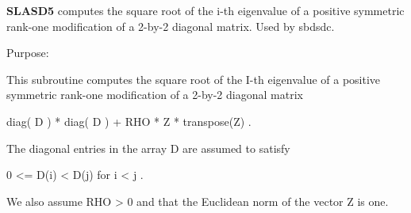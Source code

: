 {\bfseries S\+L\+A\+S\+D5} computes the square root of the i-\/th eigenvalue of a positive symmetric rank-\/one modification of a 2-\/by-\/2 diagonal matrix. Used by sbdsdc. 

 \begin{DoxyParagraph}{Purpose\+: }
\begin{DoxyVerb} This subroutine computes the square root of the I-th eigenvalue
 of a positive symmetric rank-one modification of a 2-by-2 diagonal
 matrix

            diag( D ) * diag( D ) +  RHO * Z * transpose(Z) .

 The diagonal entries in the array D are assumed to satisfy

            0 <= D(i) < D(j)  for  i < j .

 We also assume RHO > 0 and that the Euclidean norm of the vector
 Z is one.\end{DoxyVerb}
 
\end{DoxyParagraph}

